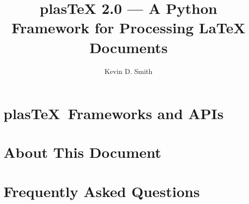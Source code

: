 \documentclass{manual}
\title{plasTeX 2.0 --- A Python Framework for Processing LaTeX Documents}
\author{Kevin D. Smith}
\newcommand{\plasTeX}{plas\TeX}
\begin{document}
\maketitle
\cleardoublepage
\tableofcontents












\chapter{\plasTeX\ Frameworks and APIs}









\appendix

\chapter{About This Document}



\chapter{Frequently Asked Questions}



\printindex
\end{document}
